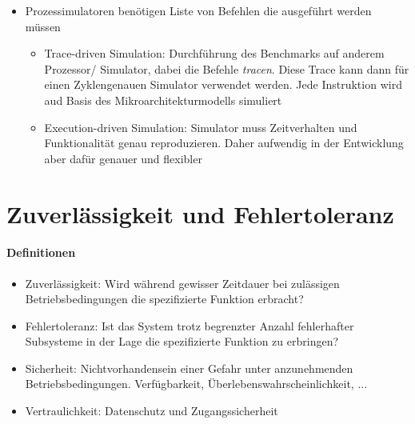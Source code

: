 \begin{itemize}
\begin{itemize}
\begin{itemize}
				\end{itemize}
				\item Prozessimulatoren benötigen Liste von Befehlen die ausgeführt werden müssen
				\begin{itemize}
					\item Trace-driven Simulation: Durchführung des Benchmarks auf anderem Prozessor/ Simulator, dabei die Befehle \emph{tracen}. Diese Trace kann dann für einen Zyklengenauen Simulator verwendet werden. Jede Instruktion wird aud Basis des Mikroarchitekturmodells simuliert
					\item Execution-driven Simulation: Simulator muss Zeitverhalten und Funktionalität genau reproduzieren. Daher aufwendig in der Entwicklung aber dafür genauer und flexibler
				\end{itemize} 
			\end{itemize}
		\end{itemize}


\section{Zuverlässigkeit und Fehlertoleranz}
	\paragraph{Definitionen}
		\begin{itemize}
			\item Zuverlässigkeit: Wird während gewisser Zeitdauer bei zulässigen Betriebsbedingungen die spezifizierte Funktion erbracht?
			\item Fehlertoleranz: Ist das System trotz begrenzter Anzahl fehlerhafter Subsysteme in der Lage die spezifizierte Funktion zu erbringen?
			\item Sicherheit: Nichtvorhandensein einer Gefahr unter anzunehmenden Betriebsbedingungen. Verfügbarkeit, Überlebenswahrscheinlichkeit, ...
			\item Vertraulichkeit: Datenschutz und Zugangssicherheit
		\end{itemize}

